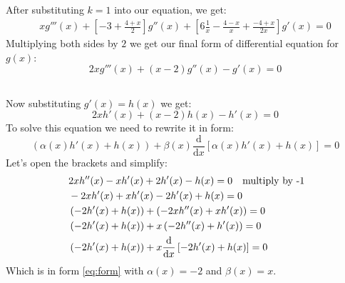 \documentclass[12pt]{article}
\begin{document}
\subsection{}
After substituting $k=1$ into our equation, we get:
\begin{eqnarray}
    xg'''(x) + \left[-3+\frac{4+x}{2}\right]g''(x) + \left[6\frac{1}{x}-\frac{4-x}{x}+\frac{-4+x}{2x}\right]g'(x) = 0 
\end{eqnarray}
Multiplying both sides by $2$ we get our final form of differential equation for $g(x)$:
\begin{equation}
    2xg'''(x) + (x-2)g''(x) - g'(x) = 0
\end{equation}
\subsection{}
Now substituting $g'(x) = h(x)$ we get:
\begin{equation}
    2xh'(x) + (x-2)h(x) - h'(x) = 0
\end{equation}
To solve this equation we need to rewrite it in form:
\begin{equation}
    \label{eq:form}
    \left(\alpha(x)h'(x)+h(x)\right) + \beta(x) \frac{\mathrm{d}}{\mathrm{d}x} \left[\alpha(x)h'(x)+h(x)\right] = 0
\end{equation}
Let's open the brackets and simplify:
\begin{equation}
    \begin{split}
        &2xh''(x) - xh'(x) + 2h'(x) - h(x) = 0 \quad \textnormal{multiply by -1}\\
        &-2xh'(x) + xh'(x) - 2h'(x) + h(x) = 0 \\
        &\left(-2h'(x)+h(x)\right) + \left(-2xh''(x)+xh'(x)\right) = 0\\
        &\left(-2h'(x)+h(x)\right) + x\left(-2h''(x)+h'(x)\right) = 0\\\
        &\left(-2h'(x)+h(x)\right) + x\frac{\mathrm{d}}{\mathrm{d}x}\left[-2h'(x)+h(x)\right] = 0\\
    \end{split}
\end{equation}
Which is in form \ref{eq:form} with $\alpha(x) = -2$ and $\beta(x) = x$.
\subsection{}
\end{document}
